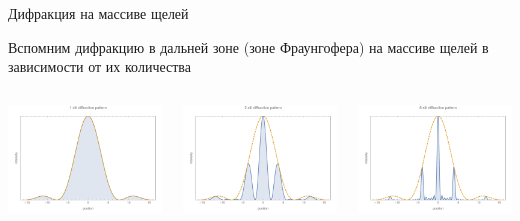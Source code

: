 \documentclass[9pt, compress, xcolor=table]{beamer}
\begin{document}
\begin{frame}{Дифракция на массиве щелей}

Вспомним дифракцию в дальней зоне (зоне Фраунгофера) на массиве щелей в зависимости от их количества 
\begin{columns}[c]
\column{4cm}
\begin{center}
\includegraphics[width=\textwidth]{nslit1}
\end{center}
\column{4cm}
\begin{center}
\includegraphics[width=\textwidth]{nslit2}
\end{center}
\column{4cm}
\begin{center}
\includegraphics[width=\textwidth]{nslit6}

\end{center}
\end{columns}
\end{frame}
\end{document}
